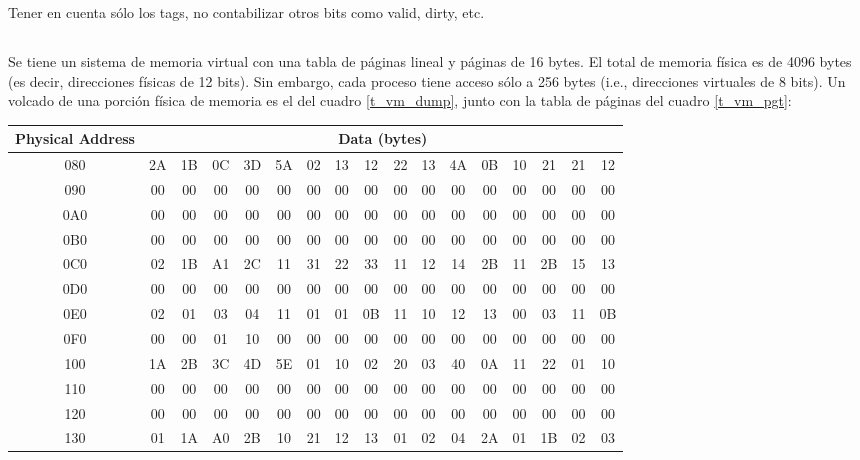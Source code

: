 Tener en cuenta sólo los tags, no contabilizar otros bits como valid, dirty, etc.

\subsection{}
Se tiene un sistema de memoria virtual con una tabla de páginas lineal y páginas de 16 bytes. El total de memoria fí­sica es de 4096 bytes (es decir, direcciones fí­sicas de 12 bits). Sin embargo, cada proceso tiene acceso sólo a 256 bytes (i.e., direcciones virtuales de 8 bits). Un volcado de una porción fí­sica de memoria es el del cuadro \ref{t_vm_dump}, junto con la tabla de páginas del cuadro \ref{t_vm_pgt}:

    \begin{table}[!ht]
      \begin{center}
      \begin{tabular}{c cccccccccccccccc}Physical Address & \multicolumn{16}{c}{Data (bytes)} \\ \hline
      080 & 2A & 1B & 0C & 3D & 5A & 02 & 13 & 12 & 22 & 13 & 4A & 0B & 10 & 21 & 21 & 12 \\
      090 & 00 & 00 & 00 & 00 & 00 & 00 & 00 & 00 & 00 & 00 & 00 & 00 & 00 & 00 & 00 & 00 \\
      0A0 & 00 & 00 & 00 & 00 & 00 & 00 & 00 & 00 & 00 & 00 & 00 & 00 & 00 & 00 & 00 & 00 \\
      0B0 & 00 & 00 & 00 & 00 & 00 & 00 & 00 & 00 & 00 & 00 & 00 & 00 & 00 & 00 & 00 & 00 \\
      0C0 & 02 & 1B & A1 & 2C & 11 & 31 & 22 & 33 & 11 & 12 & 14 & 2B & 11 & 2B & 15 & 13 \\
      0D0 & 00 & 00 & 00 & 00 & 00 & 00 & 00 & 00 & 00 & 00 & 00 & 00 & 00 & 00 & 00 & 00 \\
      0E0 & 02 & 01 & 03 & 04 & 11 & 01 & 01 & 0B & 11 & 10 & 12 & 13 & 00 & 03 & 11 & 0B \\
      0F0 & 00 & 00 & 01 & 10 & 00 & 00 & 00 & 00 & 00 & 00 & 00 & 00 & 00 & 00 & 00 & 00 \\
      100 & 1A & 2B & 3C & 4D & 5E & 01 & 10 & 02 & 20 & 03 & 40 & 0A & 11 & 22 & 01 & 10 \\
      110 & 00 & 00 & 00 & 00 & 00 & 00 & 00 & 00 & 00 & 00 & 00 & 00 & 00 & 00 & 00 & 00 \\
      120 & 00 & 00 & 00 & 00 & 00 & 00 & 00 & 00 & 00 & 00 & 00 & 00 & 00 & 00 & 00 & 00 \\
      130 & 01 & 1A & A0 & 2B & 10 & 21 & 12 & 13 & 01 & 02 & 04 & 2A & 01 & 1B & 02 & 03 \\

\end{tabular}
\end{center}
\end{table}
